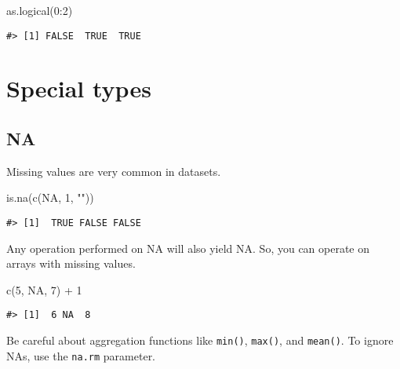 \documentclass[
]{book}
\newenvironment{Shaded}{\begin{snugshade}}{\end{snugshade}}
\newcommand{\ConstantTok}[1]{\textcolor[rgb]{0.00,0.00,0.00}{#1}}
\newcommand{\DecValTok}[1]{\textcolor[rgb]{0.00,0.00,0.81}{#1}}
\newcommand{\FunctionTok}[1]{\textcolor[rgb]{0.00,0.00,0.00}{#1}}
\newcommand{\NormalTok}[1]{#1}
\newcommand{\SpecialCharTok}[1]{\textcolor[rgb]{0.00,0.00,0.00}{#1}}
\newcommand{\StringTok}[1]{\textcolor[rgb]{0.31,0.60,0.02}{#1}}
\begin{document}
\begin{Shaded}
\begin{Highlighting}[]
\FunctionTok{as.logical}\NormalTok{(}\DecValTok{0}\SpecialCharTok{:}\DecValTok{2}\NormalTok{)}
\end{Highlighting}
\end{Shaded}

\begin{verbatim}
#> [1] FALSE  TRUE  TRUE
\end{verbatim}

\hypertarget{special-types}{%
\section{Special types}\label{special-types}}

\hypertarget{na}{%
\subsection{NA}\label{na}}

Missing values are very common in datasets.

\begin{Shaded}
\begin{Highlighting}[]
\FunctionTok{is.na}\NormalTok{(}\FunctionTok{c}\NormalTok{(}\ConstantTok{NA}\NormalTok{, }\DecValTok{1}\NormalTok{, }\StringTok{""}\NormalTok{))}
\end{Highlighting}
\end{Shaded}

\begin{verbatim}
#> [1]  TRUE FALSE FALSE
\end{verbatim}

Any operation performed on NA will also yield NA. So, you can operate on arrays with missing values.

\begin{Shaded}
\begin{Highlighting}[]
\FunctionTok{c}\NormalTok{(}\DecValTok{5}\NormalTok{, }\ConstantTok{NA}\NormalTok{, }\DecValTok{7}\NormalTok{) }\SpecialCharTok{+} \DecValTok{1}
\end{Highlighting}
\end{Shaded}

\begin{verbatim}
#> [1]  6 NA  8
\end{verbatim}

Be careful about aggregation functions like \texttt{min()}, \texttt{max()}, and \texttt{mean()}. To ignore NAs, use the \texttt{na.rm} parameter.
\end{document}
